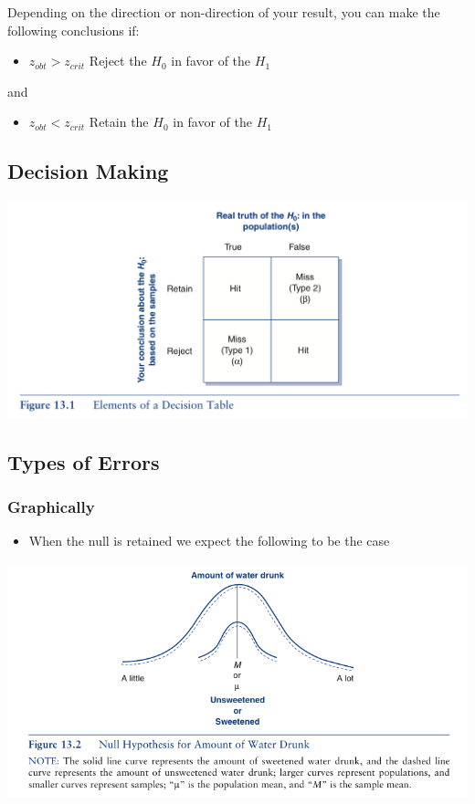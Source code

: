 \documentclass[]{article}
\begin{document}
Depending on the direction or non-direction of your result, you can make
the following conclusions if:

\begin{itemize}
\itemsep1pt\parskip0pt
\item
  $z_{obt} > z_{crit}$ Reject the $H_0$ in favor of the $H_1$
\end{itemize}

and

\begin{itemize}
\itemsep1pt\parskip0pt
\item
  $z_{obt} < z_{crit}$ Retain the $H_0$ in favor of the $H_1$
\end{itemize}

\subsection{Decision Making}\label{decision-making}

\includegraphics{decisions1.png}

\subsection{Types of Errors}\label{types-of-errors}

\subsubsection{Graphically}\label{graphically}

\begin{itemize}
\itemsep1pt\parskip0pt
\item
  When the null is retained we expect the following to be the case
\end{itemize}

\includegraphics{error1.png}
\end{document}
